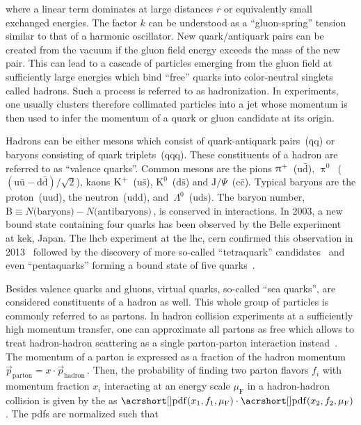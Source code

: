 where a linear term dominates at large distances $r$ or equivalently small exchanged energies. The factor $k$ can be understood as a ``gluon-spring'' tension similar to that of a harmonic oscillator. New quark/antiquark pairs can be created from the vacuum if the gluon field energy exceeds the mass of the new pair. This can lead to a cascade of particles emerging from the gluon field at sufficiently large energies which bind ``free'' quarks into color-neutral singlets called hadrons. Such a process is referred to as hadronization. In experiments, one usually clusters therefore collimated particles into a jet whose momentum is then used to infer the momentum of a quark or gluon candidate at its origin.

Hadrons can be either mesons which consist of quark-antiquark pairs~($\bar{\mathrm{q}}\mathrm{q}$) or baryons consisting of quark triplets~($\mathrm{qqq}$). These constituents of a hadron are referred to as ``valence quarks''. Common mesons are the pions $\uppi^{+}$~($\mathrm{u}\bar{\mathrm{d}}$), $\uppi^{0}$~($(\mathrm{u}\bar{\mathrm{u}}-\mathrm{d}\bar{\mathrm{d}})/\sqrt{2}$), kaons $\mathrm{K}^{+}$~($\mathrm{u}\bar{\mathrm{s}}$), $\mathrm{K}^{0}$~($\mathrm{d}\bar{\mathrm{s}}$) and $\mathrm{J}/\Psi$~($\mathrm{c}\bar{\mathrm{c}}$). Typical baryons are the proton~($\mathrm{uud}$), the neutron~($\mathrm{udd}$), and~$\Lambda^{0}$~($\mathrm{uds}$). The baryon number, $\mathrm{B}\equiv N\text{(baryons)}-N\text{(antibaryons)}\,$, is conserved in interactions. In 2003, a new bound state containing four quarks has been observed by the Belle experiment~\cite{PhysRevLett.91.262001} at \gls{kek}, Japan. The \gls{lhcb} experiment at the \gls{lhc}, \gls{cern} confirmed this observation in 2013~\cite{Aaij:2013zoa} followed by the discovery of more so-called ``tetraquark'' candidates~\cite{Aaij:2014jqa,Aaij:2016iza} and even ``pentaquarks'' forming a bound state of five quarks~\cite{Aaij:2015tga}.

Besides valence quarks and gluons, virtual quarks, so-called ``sea quarks'', are considered constituents of a hadron as well. This whole group of particles is commonly referred to as partons. In hadron collision experiments at a sufficiently high momentum transfer, one can approximate all partons as free which allows to treat hadron-hadron scattering as a single parton-parton interaction instead~\cite{Feynman:1969wa}. The momentum of a parton is expressed as a fraction of the hadron momentum $\vec{p}_\mathrm{parton}=x\cdot \vec{p}_\mathrm{hadron}\,$. Then, the probability of 
finding two parton flavors $f_{i}$ with momentum fraction $x_{i}$ interacting at an energy scale $\mu_\mathrm{F}$ in a hadron-hadron collision is given by the  as $\mathrm{\gls{pdf}}(x_{1},f_{1},\mu_\mathrm{F})\cdot\mathrm{\gls{pdf}}(x_{2},f_{2},\mu_\mathrm{F})\,$. The \glspl{pdf} are normalized such that


